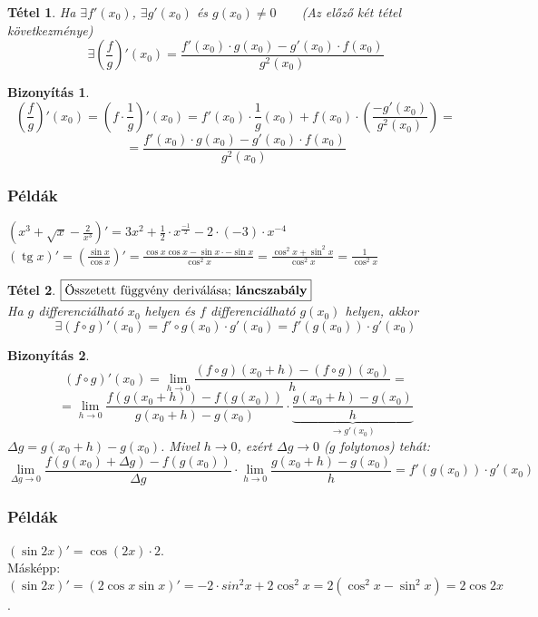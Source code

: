 \documentclass[a4paper,12pt,twoside]{book}
\DeclareMathOperator{\tg}{tg}
\newtheorem{tetel}{Tétel}[chapter]
\theoremstyle{break}
\newtheorem{biz}{Bizonyítás}[chapter]
\theoremstyle{plain}
\begin{document}
\begin{tetel} Ha $\exists f'(x_0)$, $\exists g'(x_0)$ és $g(x_0) \neq 0 \qquad $(Az előző két tétel következménye)
  \[\boxed{\exists\left(\frac{f}{g}\right)'(x_0) = \frac{f'(x_0)\cdot g(x_0)-g'(x_0)\cdot f(x_0)}{g^2(x_0)}}\]
\end{tetel}
\begin{biz}
 \[\left(\frac{f}{g}\right)'(x_0) = \left(f\cdot \frac{1}{g}\right)'(x_0) = f'(x_0)\cdot\frac{1}{g}(x_0)+f(x_0)\cdot\left(\frac{-g'(x_0)}{g^2(x_0)}\right) = \]
 \[ = \frac{f'(x_0)\cdot g(x_0)-g'(x_0)\cdot f(x_0)}{g^2(x_0)}\]
\end{biz}

\subsubsection{Példák}

$\displaystyle \left(x^3+\sqrt{x}-\frac{2}{x^3}\right)' = 3x^2+\frac{1}{2}\cdot x^{\frac{-1}{2}}-2\cdot (-3)\cdot x^{-4}$\\
$\displaystyle (\tg x)' = \left(\frac{\sin x}{\cos x}\right)' = \frac{\cos x\cos x-\sin x\cdot -\sin x}{\cos^2 x} = \frac{\cos^2 x+\sin^2 x}{\cos^2 x} = \frac{1}{\cos^2 x}$

\begin{tetel} $\boxed{$Összetett függvény deriválása; \textbf{láncszabály}$}$\\
 Ha $g$ differenciálható $x_0$ helyen és $f$ differenciálható $g(x_0)$ helyen, akkor
 \[\exists (f\circ g)'(x_0) = f'\circ g(x_0)\cdot g'(x_0) = f'(g(x_0))\cdot g'(x_0)\]
\end{tetel}
\begin{biz}
 \[(f\circ g)'(x_0) = \lim_{h\to 0} \frac{(f\circ g)(x_0+h)-(f\circ g)(x_0)}{h} = \]
 \[ = \lim_{h\to 0} \frac{f(g(x_0+h))-f(g(x_0))}{g(x_0+h)-g(x_0)}\cdot \underbrace{\frac{g(x_0+h)-g(x_0)}{h}}_{\to g'(x_0)}\]
 $\Delta g = g(x_0+h)-g(x_0)$. Mivel $h\to 0$, ezért $\Delta g \to 0$ ($g$ folytonos) tehát:
 \[\lim_{\Delta g\to 0} \frac{f(g(x_0)+\Delta g)-f(g(x_0))}{\Delta g} \cdot \lim_{h\to 0} \frac{g(x_0+h)-g(x_0)}{h} = f'(g(x_0))\cdot g'(x_0)\]
\end{biz}

\subsubsection{Példák}
$(\sin 2x)' = \cos (2x) \cdot 2$.\\
Másképp: $(\sin 2x)' = (2\cos x\sin x)' = -2\cdot sin^2 x + 2\cos^2 x = 2(\cos^2 x-\sin^2 x) = 2\cos 2x$.\\
\end{document}
